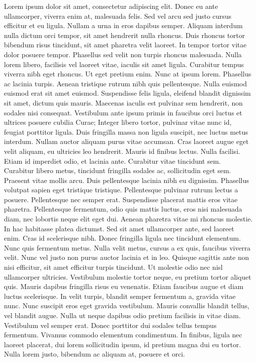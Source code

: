 \documentclass[a4paper,11pt,twoside]{book}
\begin{document}
%
\beginnumbering
\pstart
Lorem ipsum dolor sit amet, consectetur adipiscing elit. Donec eu ante ullamcorper, viverra enim at, malesuada felis. Sed vel arcu sed justo cursus efficitur et eu ligula. Nullam a urna in eros dapibus semper. Aliquam interdum nulla dictum orci tempor, sit amet hendrerit nulla rhoncus. Duis rhoncus tortor bibendum risus tincidunt, sit amet pharetra velit laoreet. In tempor tortor vitae dolor posuere tempor. Phasellus sed velit non turpis rhoncus malesuada. Nulla lorem libero, facilisis vel laoreet vitae, iaculis sit amet ligula. Curabitur tempus viverra nibh eget rhoncus. Ut eget pretium enim. Nunc at ipsum lorem. Phasellus ac lacinia turpis. Aenean tristique rutrum nibh quis pellentesque.
Nulla euismod euismod erat sit amet euismod. Suspendisse felis ligula, eleifend blandit dignissim sit amet, dictum quis mauris. Maecenas iaculis est pulvinar sem hendrerit, non sodales nisi consequat. Vestibulum ante ipsum primis in faucibus orci luctus et ultrices posuere cubilia Curae; Integer libero tortor, pulvinar vitae nunc id, feugiat porttitor ligula. Duis fringilla massa non ligula suscipit, nec luctus metus interdum. Nullam auctor aliquam purus vitae accumsan. Cras laoreet augue eget velit aliquam, eu ultricies leo hendrerit.
Mauris id finibus lectus. Nulla facilisi. Etiam id imperdiet odio, et lacinia ante. Curabitur vitae tincidunt sem. Curabitur libero metus, tincidunt fringilla sodales ac, sollicitudin eget sem. Praesent vitae mollis arcu. Duis pellentesque lacinia nibh eu dignissim. Phasellus volutpat sapien eget tristique tristique.
Pellentesque pulvinar rutrum lectus a posuere. Pellentesque nec semper erat. Suspendisse placerat mattis eros vitae pharetra. Pellentesque fermentum, odio quis mattis luctus, eros nisi malesuada diam, nec lobortis neque elit eget dui. Aenean pharetra vitae mi rhoncus molestie. In hac habitasse platea dictumst. Sed sit amet ullamcorper ante, sed laoreet enim. Cras id scelerisque nibh. Donec fringilla ligula nec tincidunt elementum. Nunc quis fermentum metus. Nulla velit metus, cursus a ex quis, faucibus viverra velit. Nunc vel justo non purus auctor lacinia et in leo. Quisque sagittis ante non nisi efficitur, sit amet efficitur turpis tincidunt. Ut molestie odio nec nisl ullamcorper ultricies.
Vestibulum molestie tortor neque, eu pretium tortor aliquet quis. Mauris dapibus fringilla risus eu venenatis. Etiam faucibus augue et diam luctus scelerisque. In velit turpis, blandit semper fermentum a, gravida vitae nunc. Nunc suscipit eros eget gravida vestibulum. Mauris convallis blandit tellus, vel blandit augue. Nulla ut neque dapibus odio pretium facilisis in vitae diam. Vestibulum vel semper erat. Donec porttitor dui sodales tellus tempus fermentum. Vivamus commodo elementum condimentum. In finibus, ligula nec laoreet placerat, dui lorem sollicitudin ipsum, id pretium magna dui eu tortor. Nulla lorem justo, bibendum ac aliquam at, posuere et orci.
\end{document}
